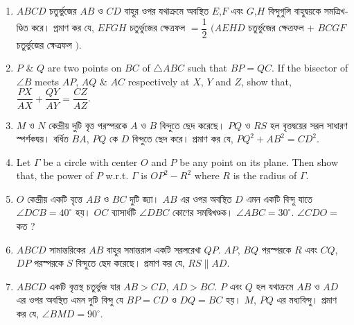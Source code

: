 \documentclass[11pt, a4paper]{article}
\begin{document}
\begin{enumerate}
	\item $ABCD$ \textbengali{চতুর্ভুজের} $AB$ \textbengali{ও} $CD$ \textbengali{বাহুর ওপর যথাক্রমে অবস্থিত} $E$,$F$ \textbengali{এবং} $G$,$H$ \textbengali{বিন্দুগুলি বাহুদ্বয়কে সমত্রিখণ্ডিত করে। প্রমাণ কর যে,} $EFGH$ \textbengali{চতুর্ভুজের ক্ষেত্রফল} $= \dfrac{1}{2}$ $\big( AEHD$ \textbengali{চতুর্ভুজের ক্ষেত্রফল} $+$ $BCGF$ \textbengali{চতুর্ভুজের ক্ষেত্রফল} $\big)$.
	
	\item $P$ \& $Q$ are two points on $BC$ of $\bigtriangleup ABC$ such that $BP = QC$. If the bisector of $\angle B$ meets $AP$, $AQ$ \& $AC$ respectively at $X$, $Y$ and $Z$, show that, $\dfrac{PX}{AX} + \dfrac{QY}{AY} = \dfrac{CZ}{AZ}$.
	
	\item $M$ \textbengali{ও} $N$ \textbengali{কেন্দ্রীয় দুটি বৃত্ত পরস্পরকে} $A$ \textbengali{ও} $B$ \textbengali{বিন্দুতে ছেদ করেছে।} $PQ$ \textbengali{ও} $RS$ \textbengali{হল বৃত্তদ্বয়ের সরল সাধারণ স্পর্শকদ্বয়।} \textbengali{বর্ধিত} $BA$, $PQ$ \textbengali{কে} $D$ \textbengali{বিন্দুতে ছেদ করে। প্রমাণ কর যে, } $PQ^2 + AB^2 = CD^2$.
	
	\item Let $\Gamma$ be a circle with center $O$ and $P$ be any point on its plane. Then show that, the power of $P$ w.r.t. $\Gamma$ is $OP^2 - R^2$ where $R$ is the radius of $\Gamma$.
	
	\item $O$ \textbengali{কেন্দ্রীয় একটি বৃত্তে} $AB$ \textbengali{ও} $BC$ \textbengali{দুটি জ্যা।} $AB$ \textbengali{এর ওপর অবস্থিত} $D$ \textbengali{এমন একটি বিন্দু যাতে} $\angle DCB = 40^{\circ}$ \textbengali{হয়।} $OC$ \textbengali{ব্যাসার্ধটি} $\angle DBC$ \textbengali{কোণের সমদ্বিখণ্ডক।} $\angle ABC = 30^{\circ}$. $\angle CDO = $ \textbengali{কত ?}
	
	\item $ABCD$ \textbengali{সামান্তরিকের} $AB$ \textbengali{বাহুর সমান্তরাল একটি সরলরেখা} $QP$. $AP$, $BQ$ \textbengali{পরস্পরকে} $R$ \textbengali{এবং} $CQ$, $DP$ \textbengali{পরস্পরকে} $S$ \textbengali{বিন্দুতে ছেদ করেছে। প্রমাণ কর যে,} $RS \parallel AD$.
	
	\item $ABCD$ \textbengali{একটি বৃত্তস্থ চতুর্ভুজ যার} $AB > CD$, $AD > BC$. $P$ \textbengali{এবং} $Q$ \textbengali{হল যথাক্রমে} $AB$ \textbengali{ও} $AD$ \textbengali{এর ওপর অবস্থিত এমন দুটি বিন্দু যে} $BP = CD$ \textbengali{ও} $DQ = BC$ \textbengali{হয়।} $M$, $PQ$ \textbengali{এর মধ্যবিন্দু। প্রমাণ কর যে,} $\angle BMD = 90^{\circ}$.
	

\end{enumerate}
\end{document}
